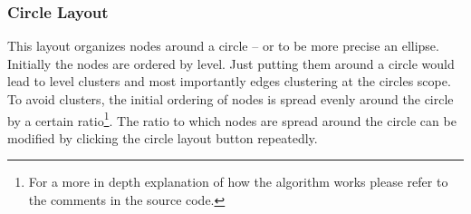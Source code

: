 \documentclass[10pt, a4paper]{article}
\begin{document}
\subsubsection{Circle Layout}
\label{label:circleLayout}

This layout organizes nodes around a circle -- or to be more precise an ellipse. Initially the nodes are ordered by level. Just putting them around a circle would lead to level clusters and most importantly edges clustering at the circles scope. To avoid clusters, the initial ordering of nodes is spread evenly around the circle by a certain ratio\footnote{For a more in depth explanation of how the algorithm works please refer to the comments in the source code.}. The ratio to which nodes are spread around the circle can be modified by clicking the circle layout button repeatedly.
\end{document}
